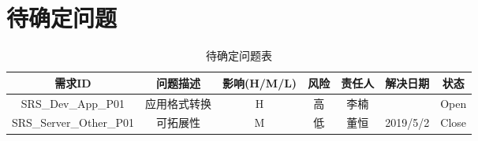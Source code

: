\chapter{待确定问题}
\begin{table}[htbp]
\centering
\caption{待确定问题表} \label{tab:tbd_problems}
\begin{tabular}{|c|c|c|c|c|c|c|}
    \hline %
    需求ID & 问题描述 & 影响(H/M/L) & 风险 & 责任人 & 解决日期 & 状态 \\
    \hline
    SRS\_Dev\_App\_P01 & 应用格式转换 & H & 高 & 李楠 &  & Open\\
    \hline
    SRS\_Server\_Other\_P01 & 可拓展性 & M & 低 & 董恒 & 2019/5/2 & Close\\
    \hline
\end{tabular}
\end{table}